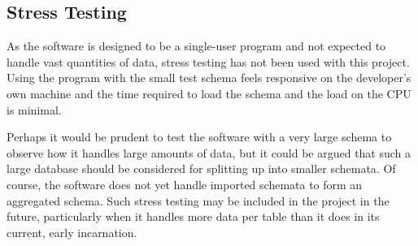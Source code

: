 \subsection{Stress Testing}
As the software is designed to be a single-user program and not expected to handle vast quantities of data, stress testing has not been used with this project. Using the program with the small test schema feels responsive on the developer's own machine and the time required to load the schema and the load on the CPU is minimal.

Perhaps it would be prudent to test the software with a very large schema to observe how it handles large amounts of data, but it could be argued that such a large database should be considered for splitting up into smaller schemata. Of course, the software does not yet handle imported schemata to form an aggregated schema. Such stress testing may be included in the project in the future, particularly when it handles more data per table than it does in its current, early incarnation.




